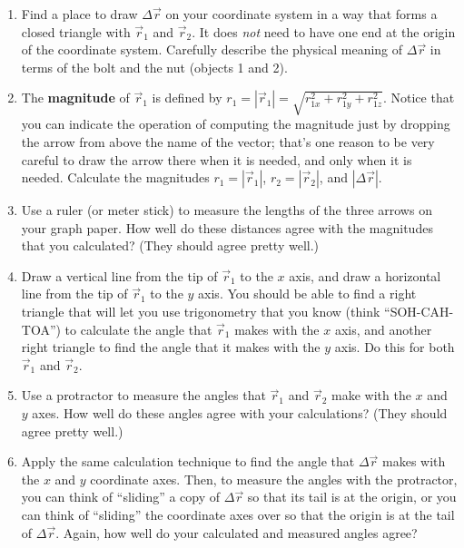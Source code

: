 \documentclass[11pt]{article}
\begin{document}
\begin{enumerate}
\item Find a place to draw  $\Delta\vec{r}$ on your coordinate system 
  in a way that forms a closed triangle with $\vec{r}_1$ and $\vec{r}_2$.
  It does {\em not} need to have one end at the origin of the coordinate 
  system.  Carefully describe the physical meaning of $\Delta\vec{r}$
  in terms of the bolt and the nut (objects 1 and 2).

\item The {\textbf{magnitude}} of ${\vec{r}_1}$ is defined by 
 $r_1 = \left| \vec{r}_1 \right| = \sqrt{r_{1x}^2 + r_{1y}^2 + r_{1z}^2}$.  Notice that 
 you can indicate the operation of computing the magnitude just by dropping 
 the arrow from above the name of the vector; that's one reason to be very 
 careful to draw the arrow there when it is needed, and only when it is needed.
 Calculate the magnitudes  $r_1 = \left| \vec{r}_1 \right| $, $r_2 = \left| \vec{r}_2 \right|$,
 and $\left| \Delta {\vec r} \right|$.

\item Use a ruler (or meter stick) to measure the lengths of the three arrows 
  on your graph paper.  How well do these distances agree with the magnitudes 
  that you calculated?  (They should agree pretty well.)

\item Draw a vertical line from the tip of ${\vec{r}_1}$ to the $x$ axis, 
  and draw a horizontal line from the tip of  ${\vec{r}_1}$ to the $y$ axis.
  You should be able to find a right triangle that will let you use 
  trigonometry that you know (think ``SOH-CAH-TOA'') to calculate the angle
  that  ${\vec{r}_1}$ makes with the $x$ axis, and another right triangle
  to find the angle that it makes with the $y$ axis.  Do this for both
  ${\vec{r}_1}$ and ${\vec{r}_2}$.

\item Use a protractor to measure the angles that ${\vec{r}_1}$ 
  and ${\vec{r}_2}$ make with the $x$ and $y$ axes.  How well do these
  angles agree with your calculations?  (They should agree pretty well.)

\item Apply the same calculation technique to find the 
  angle that $\Delta {\vec r}$ makes with the $x$ and $y$ coordinate
  axes.   Then, to measure the angles with the protractor, you can think 
  of ``sliding'' a copy of $\Delta {\vec r}$ so that its tail is at the 
  origin, or you can think of ``sliding'' the coordinate axes over so that the 
  origin is at the tail of $\Delta {\vec r}$.  Again, how well do your
  calculated and measured angles agree?


\end{enumerate}
\end{document}

